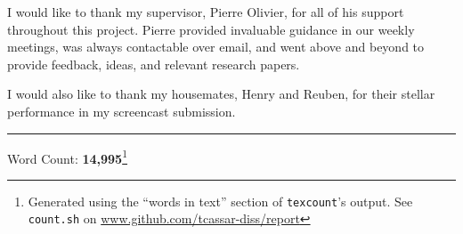 I would like to thank my supervisor, Pierre Olivier, for all of his support
throughout this project. Pierre provided invaluable guidance in our weekly
meetings, was always contactable over email, and went above and beyond to
provide feedback, ideas, and relevant research papers. 

I would also like to thank my housemates, Henry and Reuben, for their stellar
performance in my screencast submission.

\clearpage

\tableofcontents

\vspace{2em}
\noindent\rule{0.3\linewidth}{0.4pt} %
\vspace{0.1em}
\par
\noindent
Word Count: \textbf{14,995}\footnote{Generated using the ``words
    in text'' section of \texttt{texcount}'s output. See \texttt{count.sh} on
\href{https://github.com/tcassar-diss/report/blob/22fb0f59cd3ad3901718e77f0a7f9bfc86ec3180/count.sh}{www.github.com/tcassar-diss/report}}
\par\clearpage

\printacronyms[name=Acronyms and Abbreviations]

\clearpage

\listoffigures

\clearpage

\listoftables

\clearpage

\listoflistings
